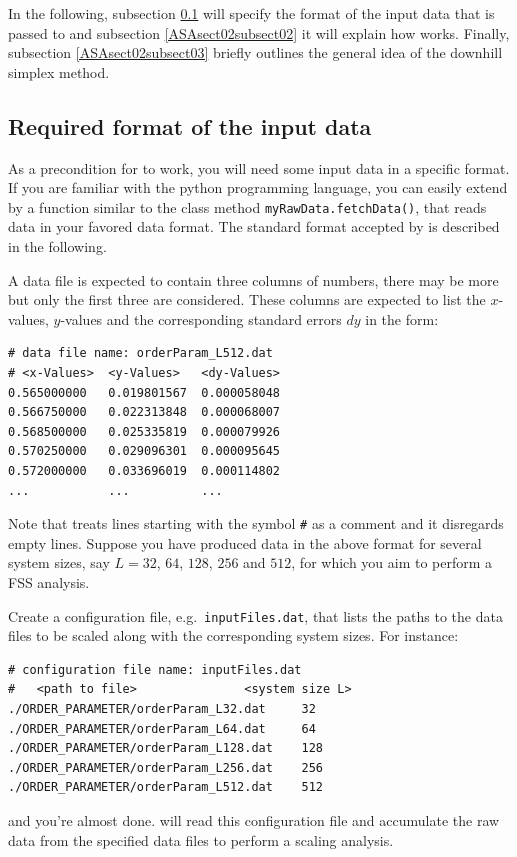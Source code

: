 In the following, subsection \ref{ASAsect02subsect01} will specify the format of the input data that is 
passed to \myProg{} and subsection \ref{ASAsect02subsect02} it will explain how \myProg{} works.   
Finally, subsection \ref{ASAsect02subsect03} briefly outlines the general idea of the downhill simplex method.

 
\subsection{Required format of the input data} 
\label{ASAsect02subsect01}
As a precondition for \myProg{} to work, you will need some input data in a specific format.
If you are familiar with the python programming language, you can easily extend \myProg{}
by a function similar to the class method {\tt myRawData.fetchData()}, that reads data in 
your favored data format.
The standard format accepted by \myProg{} is described in the following. 

A data file is expected to contain three columns of numbers, there may be more but only the first three 
are considered. These columns are expected to list the $x$-values, $y$-values and the corresponding 
standard errors $dy$ in the form:

\begin{lstlisting}
# data file name: orderParam_L512.dat 
# <x-Values>  <y-Values>   <dy-Values>
0.565000000   0.019801567  0.000058048 
0.566750000   0.022313848  0.000068007 
0.568500000   0.025335819  0.000079926 
0.570250000   0.029096301  0.000095645 
0.572000000   0.033696019  0.000114802 
...           ...          ...
\end{lstlisting}
Note that \myProg{} treats lines starting with the symbol \verb'#' as a comment and it disregards empty lines.
Suppose you have produced data in the above format for several system sizes, 
say $L = 32$, $64$, $128$, $256$ and $512$, for which you aim to perform a FSS analysis. 

Create a configuration file, e.g.\ {\tt inputFiles.dat}, that lists the paths 
to the data files to be scaled along with the corresponding system sizes. 
For instance:

\begin{lstlisting}
# configuration file name: inputFiles.dat
# 	<path to file>               <system size L>
./ORDER_PARAMETER/orderParam_L32.dat     32
./ORDER_PARAMETER/orderParam_L64.dat     64
./ORDER_PARAMETER/orderParam_L128.dat    128
./ORDER_PARAMETER/orderParam_L256.dat    256
./ORDER_PARAMETER/orderParam_L512.dat    512
\end{lstlisting}
and you're almost done. \myProg{} will read this configuration file and accumulate 
the raw data from the specified data files to perform a scaling analysis.

